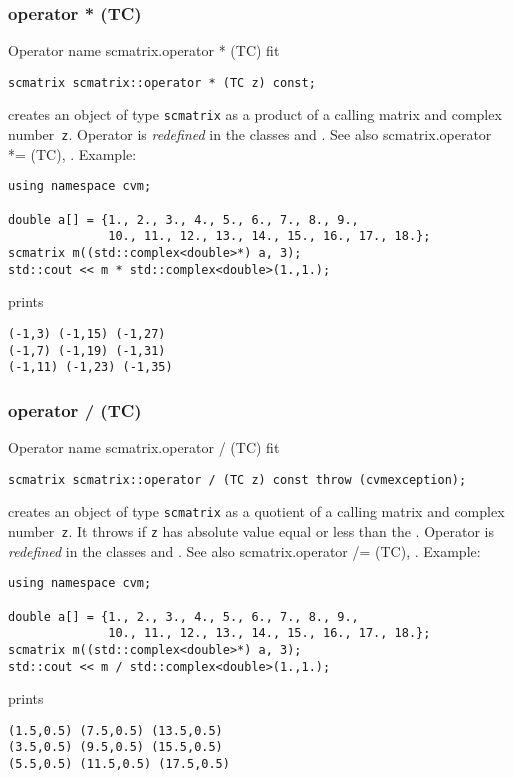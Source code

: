 \subsubsection{operator * (TC)}
Operator%
\pdfdest name {scmatrix.operator * (TC)} fit
\begin{verbatim}
scmatrix scmatrix::operator * (TC z) const;
\end{verbatim}
creates an object of type \verb"scmatrix" as a product of
a calling matrix and  complex number~\verb"z".
Operator is \emph{redefined} in the classes
and .
See also 
{scmatrix.operator *= (TC)},
.
Example:
\begin{Verbatim}
using namespace cvm;

double a[] = {1., 2., 3., 4., 5., 6., 7., 8., 9.,
              10., 11., 12., 13., 14., 15., 16., 17., 18.};
scmatrix m((std::complex<double>*) a, 3);
std::cout << m * std::complex<double>(1.,1.);
\end{Verbatim}
prints
\begin{Verbatim}
(-1,3) (-1,15) (-1,27)
(-1,7) (-1,19) (-1,31)
(-1,11) (-1,23) (-1,35)
\end{Verbatim}
\newpage



\subsubsection{operator / (TC)}
Operator%
\pdfdest name {scmatrix.operator / (TC)} fit
\begin{verbatim}
scmatrix scmatrix::operator / (TC z) const throw (cvmexception);
\end{verbatim}
creates an object of type \verb"scmatrix" as a quotient of
a calling matrix and  complex number~\verb"z". 
It throws
if \verb"z" has  absolute value equal or less than the
.
Operator is \emph{redefined} in the classes
and .
See also 
{scmatrix.operator /= (TC)},
.
Example:
\begin{Verbatim}
using namespace cvm;

double a[] = {1., 2., 3., 4., 5., 6., 7., 8., 9.,
              10., 11., 12., 13., 14., 15., 16., 17., 18.};
scmatrix m((std::complex<double>*) a, 3);
std::cout << m / std::complex<double>(1.,1.);
\end{Verbatim}
prints
\begin{Verbatim}
(1.5,0.5) (7.5,0.5) (13.5,0.5)
(3.5,0.5) (9.5,0.5) (15.5,0.5)
(5.5,0.5) (11.5,0.5) (17.5,0.5)
\end{Verbatim}
\newpage



